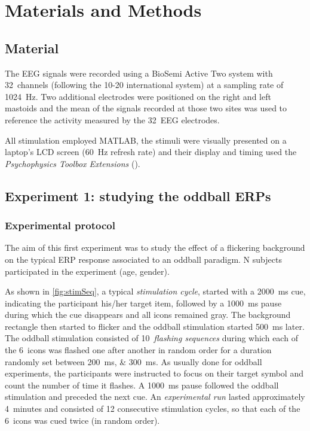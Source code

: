 \documentclass[10pt]{article}
\begin{document}
\section{Materials and Methods}
\label{sec:2MatAndMet}

    \subsection{Material}
    \label{sec:2.1Material}

    The EEG signals were recorded using a BioSemi Active Two system with 32~channels (following the 10-20 international system) at a sampling rate of \SI{1024}{\Hz}.
    Two additional electrodes were positioned on the right and left mastoids and the mean of the signals recorded at those two sites was used to reference the activity measured by the 32~EEG electrodes.

    All stimulation employed MATLAB\textsuperscript{\textregistered}, the stimuli were visually presented on a laptop's LCD screen (\SI{60}{\Hz} refresh rate) and their display and timing used the \emph{Psychophysics Toolbox Extensions} (\cite{Brainard1997,Pelli1997}).



    \subsection{Experiment 1: studying the oddball ERPs}
    \label{sec:2.2Oddball}

        \subsubsection{Experimental protocol}
        \label{sec:2.2.1Protocol}

        The aim of this first experiment was to study the effect of a flickering background on the typical ERP response associated to an oddball paradigm.
        N subjects participated in the experiment (age, gender).

        As shown in \autoref{fig:stimSeq}, a typical \emph{stimulation cycle}, started with a \SI{2000}{\ms} cue, indicating the participant his/her target item, followed by a \SI{1000}{\ms} pause during which the cue disappears and all icons remained gray.
        The background rectangle then started to flicker and the oddball stimulation started \SI{500}{\ms} later.
        The oddball stimulation consisted of 10~\emph{flashing sequences} during which each of the 6~icons was flashed one after another in random order for a duration randomly set between \SIlist[list-units = single]{200;300}{\ms}.
        As usually done for oddball experiments, the participants were instructed to focus on their target symbol and count the number of time it flashes.
        A \SI{1000}{\ms} pause followed the oddball stimulation and preceded the next cue.
        An \emph{experimental run} lasted approximately 4~minutes and consisted of 12 consecutive stimulation cycles, so that each of the 6~icons was cued twice (in random order).
\end{document}
